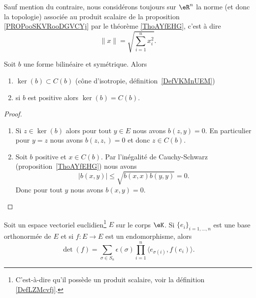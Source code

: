 \begin{definition}        \label{DEFooJAGXooMgaUsR}
	Sauf mention du contraire, nous considérons toujours sur \( \eR^n\) la norme (et donc la topologie) associée au produit scalaire de la proposition \ref{PROPooSKVRooDGVCYj} par le théorème \ref{ThoAYfEHG}, c'est à dire
	\begin{equation}
		\| x \|=\sqrt{ \sum_{i=1}^nx_i^2 }.
	\end{equation}
\end{definition}

\begin{proposition}     \label{PropHIWjdMX}
	Soit \( b\) une forme bilinéaire et symétrique. Alors
	\begin{enumerate}
		\item
		      \( \ker(b)\subset C(b)\) (cône d'isotropie, définition~\ref{DefVKMnUEM})
		\item
		      si \( b\) est positive alors \( \ker(b)=C(b)\).
	\end{enumerate}
\end{proposition}

\begin{proof}
	\begin{enumerate}
		\item
		      Si \( z\in\ker(b)\) alors pour tout \( y\in E\) nous avons \( b(z,y)=0\). En particulier pour \( y=z\) nous avons \( b(z,z,)=0\) et donc \( z\in C(b)\).
		\item
		      Soit \( b\) positive et \( x\in C(b)\). Par l'inégalité de Cauchy-Schwarz (proposition~\ref{ThoAYfEHG}) nous avons
		      \begin{equation}
			      | b(x,y) |\leq \sqrt{   b(x,x)b(y,y) }=0.
		      \end{equation}
		      Donc pour tout \( y\) nous avons \( b(x,y)=0\).
	\end{enumerate}
\end{proof}

\begin{lemma}       \label{LEMooEZFIooXyYybe}
	Soit un espace vectoriel euclidien\footnote{C'est-à-dire qu'il possède un produit scalaire, voir la définition \ref{DefLZMcvfj}.} \( E\) sur le corps \( \eK\). Si \( \{ e_i \}_{i=1,\ldots, n}\) est une base orthonormée de \( E\) et si \( f\colon E\to E\) est un endomorphisme, alors
	\begin{equation}        \label{EQooQAZLooZutFUz}
		\det(f)=\sum_{\sigma\in S_n}\epsilon(\sigma)\prod_{i=1}^n\langle e_{\sigma(i)}, f(e_i)\rangle.
	\end{equation}
\end{lemma}

